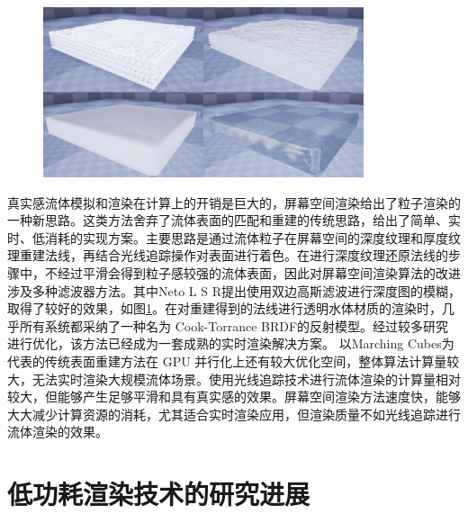 \begin{figure}[ht]
 \centering
 \includegraphics[height=5cm]{image/ssr.png}
 \label{fig:ssr}
\end{figure}

\indent 真实感流体模拟和渲染在计算上的开销是巨大的，屏幕空间渲染\cite{van2009screen}给出了粒子渲染的一种新思路。这类方法舍弃了流体表面的匹配和重建的传统思路，给出了简单、实时、低消耗的实现方案。主要思路是通过流体粒子在屏幕空间的深度纹理和厚度纹理重建法线，再结合光线追踪操作对表面进行着色。在进行深度纹理还原法线的步骤中，不经过平滑会得到粒子感较强的流体表面，因此对屏幕空间渲染算法的改进涉及多种滤波器方法\cite{muller2007screen, bagar2010layered, neto2017real, truong2018narrow, oliveira2022narrow}。其中Neto L S R\cite{neto2017real}提出使用双边高斯滤波进行深度图的模糊，取得了较好的效果，如图\ref{fig:ssr}。在对重建得到的法线进行透明水体材质的渲染时，几乎所有系统都采纳了一种名为 Cook-Torrance BRDF\cite{cook1982reflectance}的反射模型。经过较多研究进行优化\cite{schlick1994inexpensive, burley2012physically}，该方法已经成为一套成熟的实时渲染解决方案。
\newline
\indent 以Marching Cubes为代表的传统表面重建方法在 GPU 并行化上还有较大优化空间，整体算法计算量较大，无法实时渲染大规模流体场景。使用光线追踪技术进行流体渲染的计算量相对较大，但能够产生足够平滑和具有真实感的效果。屏幕空间渲染方法速度快，能够大大减少计算资源的消耗，尤其适合实时渲染应用，但渲染质量不如光线追踪进行流体渲染的效果。

\section{低功耗渲染技术的研究进展}

